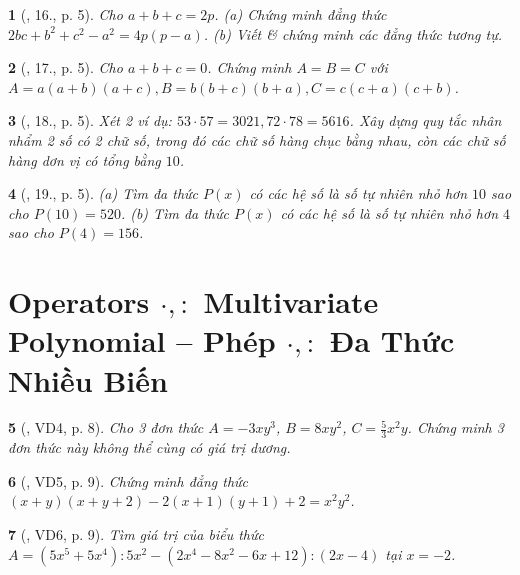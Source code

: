 \documentclass{article}
\newtheorem{baitoan}{}
\begin{document}
\begin{baitoan}[\cite{Binh_Toan_8_tap_1}, 16., p. 5]
	Cho $a + b + c = 2p$. (a) Chứng minh đẳng thức $2bc + b^2 + c^2 - a^2 = 4p(p - a)$. (b) Viết \& chứng minh các đẳng thức tương tự.
\end{baitoan}

\begin{baitoan}[\cite{Binh_Toan_8_tap_1}, 17., p. 5]
	Cho $a + b + c = 0$. Chứng minh $A = B = C$ với $A = a(a + b)(a + c),B = b(b + c)(b + a),C = c(c + a)(c + b)$.
\end{baitoan}

\begin{baitoan}[\cite{Binh_Toan_8_tap_1}, 18., p. 5]
	Xét 2 ví dụ: $53\cdot57 = 3021,72\cdot78 = 5616$. Xây dựng quy tắc nhân nhẩm 2 số có 2 chữ số, trong đó các chữ số hàng chục bằng nhau, còn các chữ số hàng dơn vị có tổng bằng $10$.
\end{baitoan}

\begin{baitoan}[\cite{Binh_Toan_8_tap_1}, 19., p. 5]
	(a) Tìm đa thức $P(x)$ có các hệ số là số tự nhiên nhỏ hơn $10$ sao cho $P(10) = 520$. (b) Tìm đa thức $P(x)$ có các hệ số là số tự nhiên nhỏ hơn $4$ sao cho $P(4) = 156$.
\end{baitoan}


\section{Operators $\cdot,:$ Multivariate Polynomial -- Phép $\cdot,:$ Đa Thức Nhiều Biến}

\begin{baitoan}[\cite{Tuyen_Toan_8}, VD4, p. 8]
	Cho 3 đơn thức $A = -3xy^3$, $B = 8xy^2$, $C = \frac{5}{3}x^2y$. Chứng minh 3 đơn thức này không thể cùng có giá trị dương.
\end{baitoan}

\begin{baitoan}[\cite{Tuyen_Toan_8}, VD5, p. 9]
	Chứng minh đẳng thức $(x + y)(x + y + 2) - 2(x + 1)(y + 1) + 2 = x^2y^2$.
\end{baitoan}

\begin{baitoan}[\cite{Tuyen_Toan_8}, VD6, p. 9]
	Tìm giá trị của biểu thức $A = (5x^5 + 5x^4):5x^2 - (2x^4 - 8x^2 - 6x + 12):(2x - 4)$ tại $x = -2$.
\end{baitoan}
\end{document}
